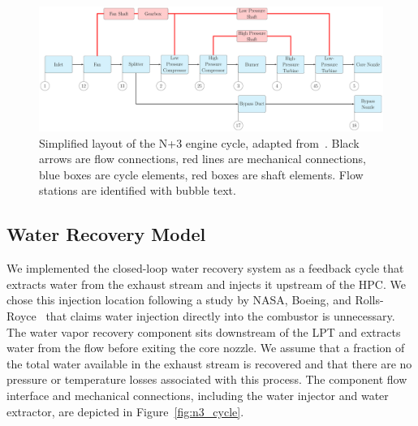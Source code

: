 \documentclass[conf]{new-aiaa}
\begin{document}
\begin{figure}[hbt!]
    \centering
    \includegraphics[width=1.0\textwidth]{N3_cycle.pdf}
    \caption{
        Simplified layout of the N+3 engine cycle, adapted from~\citet{Hendricks2019}.
        Black arrows are flow connections, red lines are mechanical connections, blue boxes are cycle elements, red boxes are shaft elements.
        Flow stations are identified with bubble text.
    }
    \label{fig:N3_original}
\end{figure}

\subsection{Water Recovery Model}
We implemented the closed-loop water recovery system as a feedback cycle that extracts water from the exhaust stream and injects it upstream of the HPC.
We chose this injection location following a study by NASA, Boeing, and Rolls-Royce~\cite{Daggett2010} that claims water injection directly into the combustor is unnecessary.
The water vapor recovery component sits downstream of the LPT and extracts water from the flow before exiting the core nozzle.
We assume that a fraction of the total water available in the exhaust stream is recovered and that there are no pressure or temperature losses associated with this process.
The component flow interface and mechanical connections, including the water injector and water extractor, are depicted in Figure~\ref{fig:n3_cycle}.
\end{document}
